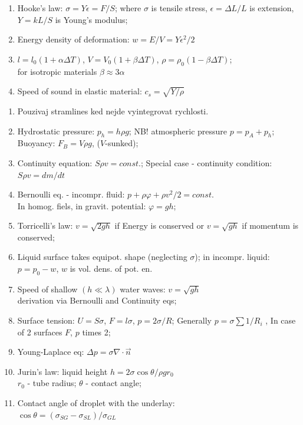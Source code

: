 \documentclass{article}
\begin{document}
\begin{multicols}{3}
        \begin{enumerate}
            \item Hooke's law: $\sigma=Y\epsilon=F/S$; where $\sigma$ is tensile stress, $\epsilon=\Delta L/L$ is extension, $Y=kL/S$ is Young's modulus;
            \item Energy density of deformation: $w=E/V=Y\epsilon^2/2$
            \item $l=l_0(1+\alpha\Delta T)$, $V=V_0(1+\beta\Delta T)$, $\rho=\rho_0(1-\beta\Delta T)$;\\for isotropic materials $\beta\approx 3\alpha$
            \item Speed of sound in elastic material: $c_s=\sqrt{Y/\rho}$
        \end{enumerate}

        \begin{enumerate}
		\item Pouzivaj stramlines ked nejde vyintegrovat rychlosti.
            \item Hydrostatic pressure: $p_h=h\rho g$; NB! atmospheric pressure $p=p_A+p_h$; Buoyancy: $F_B=V\rho g$, ($V$-sunked);
            \item Continuity equation: $S\rho v=const.$; Special case - continuity condition: $S\rho v=dm/dt$
            \item Bernoulli eq. - incompr. fluid: $p+\rho\varphi+\rho v^2/2=const.$\\In homog. fiels, in gravit. potential: $\varphi=gh$;
            \item Torricelli's law: $v=\sqrt{2gh}$ if Energy  is conserved or $v=\sqrt{gh}$ if momentum is conserved;
            \item Liquid surface takes equipot. shape (neglecting $\sigma$); in incompr. liquid: $p=p_0-w$, $w$ is vol. dens. of pot. en.
            \item Speed of shallow $(h\ll\lambda)$ water waves: $v=\sqrt{gh}$\\derivation via Bernoulli and Continuity eqs;
            \item Surface tension: $U=S\sigma$, $F=l\sigma$, $p=2\sigma/R$; Generally $p=\sigma\sum 1/R_i$ , In case of 2 surfaces $F$, $p$ times 2;
            \item Young-Laplace eq: $\Delta p=\sigma\nabla\cdot\vec n$
            \item Jurin's law: liquid height $h=2\sigma\cos\theta/\rho gr_0$\\$r_0$ - tube radius; $\theta$ - contact angle;
            \item Contact angle of droplet with the underlay:\\$\cos\theta=(\sigma_{SG}-\sigma_{SL})/\sigma_{GL}$
        \end{enumerate}

    \newpage
\end{multicols}
\end{document}
